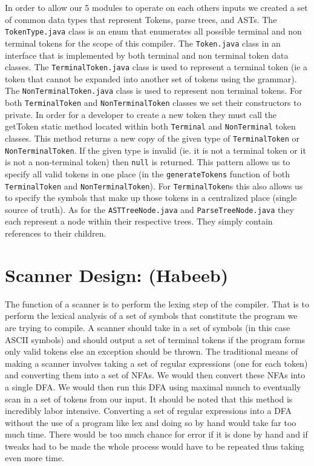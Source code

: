 \documentclass[12pt]{article}
\begin{document}
In order to allow our 5 modules to operate on each others inputs we created a set of common data
types that represent Tokens, parse trees, and ASTs. The \texttt{TokenType.java} class is an enum
that enumerates all possible terminal and non terminal tokens for the scope of this compiler. The
\texttt{Token.java} class in an interface that is implemented by both terminal and non terminal
token data classes. The \texttt{TerminalToken.java} class is used to represent a terminal token (ie
a token that cannot be expanded into another set of tokens using the grammar). The
\texttt{NonTerminalToken.java} class is used to represent non terminal tokens. For both
\texttt{TerminalToken} and \texttt{NonTerminalToken} classes we set their constructors to private.
In order for a developer to create a new token they must call the getToken static method located
within both \texttt{Terminal} and \texttt{NonTerminal} token classes. This method returns a new copy
of the given type of \texttt{TerminalToken} or \texttt{NonTerminalToken}. If the given type is
invalid (ie. it is not a terminal token or it is not a non-terminal token) then \texttt{null} is
returned. This pattern allows us to specify all valid tokens in one place (in the
\texttt{generateTokens} function of both \texttt{TerminalToken} and \texttt{NonTerminalToken}). For
\texttt{TerminalToken}s this also allows us to specify the symbols that make up those tokens in a
centralized place (single source of truth). As for the \texttt{ASTTreeNode.java} and
\texttt{ParseTreeNode.java} they each represent a node within their respective trees. They simply
contain references to their children.

\section*{Scanner Design: (Habeeb)}

The function of a scanner is to perform the lexing step of the compiler. That is to perform the
lexical analysis of a set of symbols that constitute the program we are trying to compile. A scanner
should take in a set of symbols (in this case ASCII symbols) and should output a set of terminal
tokens if the program forms only valid tokens else an exception should be thrown.	 The traditional
means of making a scanner involves taking a set of regular expressions (one for each token) and
converting them into a set of NFAs. We would then convert these NFAs into a single DFA. We would
then run this DFA using maximal munch to eventually scan in a set of tokens from our input. It
should be noted that this method is incredibly labor intensive. Converting a set of regular
expressions into a DFA without the use of a program like lex and doing so by hand would take far too
much time. There would be too much chance for error if it is done by hand and if tweaks had to be
made the whole process would have to be repeated thus taking even more time.
\end{document}
